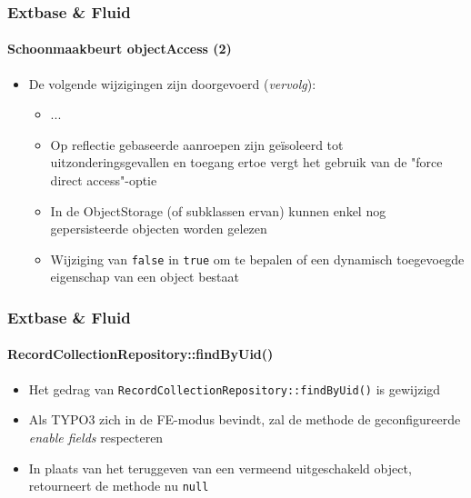 \begin{frame}[fragile]
	\frametitle{Extbase \& Fluid}
	\framesubtitle{Schoonmaakbeurt objectAccess (2)}

	\begin{itemize}

		\item De volgende wijzigingen zijn doorgevoerd (\textit{vervolg}):

			\begin{itemize}
				\item ...
				\item Op reflectie gebaseerde aanroepen zijn geïsoleerd tot uitzonderingsgevallen en toegang ertoe 
					vergt het gebruik van de "force direct access"-optie
				\item In de ObjectStorage (of subklassen ervan) kunnen enkel nog gepersisteerde objecten worden gelezen
				\item Wijziging van \texttt{false} in \texttt{true} om te bepalen of een dynamisch toegevoegde 
					eigenschap van een object bestaat
			\end{itemize}

	\end{itemize}

\end{frame}


\begin{frame}[fragile]
	\frametitle{Extbase \& Fluid}
	\framesubtitle{RecordCollectionRepository::findByUid()}

	\begin{itemize}
		\item Het gedrag van \texttt{RecordCollectionRepository::findByUid()} is gewijzigd
		\item Als TYPO3 zich in de FE-modus bevindt, zal de methode de geconfigureerde \textit{enable fields} respecteren
		\item In plaats van het teruggeven van een vermeend uitgeschakeld object, retourneert de methode nu \texttt{null}

	\end{itemize}

\end{frame}

